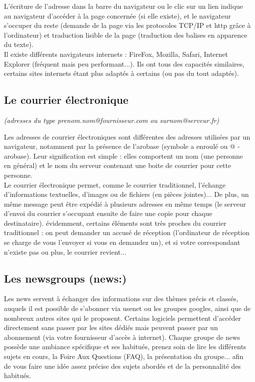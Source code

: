 \documentclass[11pt,twoside,a4paper]{article}
\begin{document}
		L'{\'e}criture de l'adresse dans la barre du navigateur ou le clic sur un lien indique au navigateur d'acc{\'e}der {\`a} la page concern{\'e}e (si elle existe), et le navigateur s'occuper du reste (demande de la page via les protocoles TCP/IP et http gr{\^a}ce {\`a} l'ordinateur) et traduction lisible de la page (traduction des balises en apparence du texte). ~\\

		Il existe diff{\'e}rents navigateurs internets : FireFox, Mozilla, Safari, Internet Explorer (fr{\'e}quent mais peu performant...). Ils ont tous des capacit{\'e}s similaires, certains sites internets {\'e}tant plus adapt{\'e}s {\`a} certains (ou pas du tout adapt{\'e}s). ~\\

	\subsection{Le courrier {\'e}lectronique}
\textit{(adresses du type prenom.nom@fournisseur.com ou surnom@serveur.fr)}

			Les adresses de courrier {\'e}lectroniques sont diff{\'e}rentes des adresses utilis{\'e}es par un navigateur, notamment par la pr{\'e}sence de l'arobase (symbole a enroul{\'e} ou @ - arobase). Leur signification est simple : elles comportent un nom (une personne en g{\'e}n{\'e}ral) et le nom du serveur contenant une boite de courrier pour cette personne. ~\\

			Le courrier {\'e}lectronique permet, comme le courrier traditionnel, l'{\'e}change d'informations textuelles, d'images ou de fichiers (en pi{\`e}ces jointes)... De plus, un m{\^e}me message peut {\^e}tre exp{\'e}di{\'e} {\`a} plusieurs adresses en m{\^e}me temps (le serveur d'envoi du courrier s'occupant ensuite de faire une copie pour chaque destinataire). {\'e}videmment, certains {\'e}l{\'e}ments sont tr{\`e}s proches du courrier traditionnel : on peut demander un accus{\'e} de r{\'e}ception (l'ordinateur de r{\'e}ception se charge de vous l'envoyer si vous en demandez un), et si votre correspondant n'existe pas ou plus, le courrier revient...~\\

	\subsection{Les newsgroups (news:)}
			Les news servent {\`a} {\'e}changer des informations sur des th{\`e}mes pr{\'e}cis et class{\'e}s, auquels il est possible de s'abonner via usenet ou les groupes googles, ainsi que de nombreux autres sites qui le proposent. Certains logiciels permettent d'acc{\'e}der directement sans passer par les sites d{\'e}di{\'e}s mais peuvent passer par un abonnement (via votre fournisseur d'acc{\`e}s {\`a} internet). Chaque groupe de news poss{\`e}de une ambiance sp{\'e}cifique et ses habitu{\'e}s, prenez soin de lire les diff{\'e}rents sujets en cours, la Foire Aux Questions (FAQ), la pr{\'e}sentation du groupe... afin de vous faire une id{\'e}e assez pr{\'e}cise des sujets abord{\'e}s et de la personnalit{\'e} des habitu{\'e}s. ~\\
\end{document}
